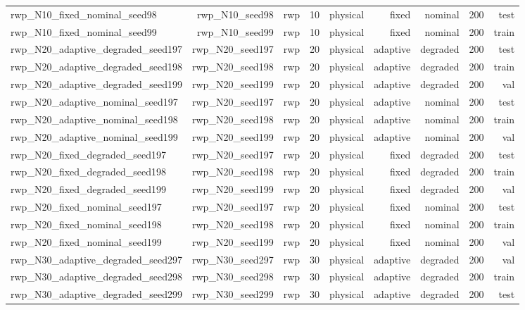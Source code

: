 \begin{tabular}{lrrrrrrrr}
rwp\_N10\_fixed\_nominal\_seed98 & rwp\_N10\_seed98 & rwp & 10 & physical & fixed & nominal & 200 & test \\
rwp\_N10\_fixed\_nominal\_seed99 & rwp\_N10\_seed99 & rwp & 10 & physical & fixed & nominal & 200 & train \\
rwp\_N20\_adaptive\_degraded\_seed197 & rwp\_N20\_seed197 & rwp & 20 & physical & adaptive & degraded & 200 & test \\
rwp\_N20\_adaptive\_degraded\_seed198 & rwp\_N20\_seed198 & rwp & 20 & physical & adaptive & degraded & 200 & train \\
rwp\_N20\_adaptive\_degraded\_seed199 & rwp\_N20\_seed199 & rwp & 20 & physical & adaptive & degraded & 200 & val \\
rwp\_N20\_adaptive\_nominal\_seed197 & rwp\_N20\_seed197 & rwp & 20 & physical & adaptive & nominal & 200 & test \\
rwp\_N20\_adaptive\_nominal\_seed198 & rwp\_N20\_seed198 & rwp & 20 & physical & adaptive & nominal & 200 & train \\
rwp\_N20\_adaptive\_nominal\_seed199 & rwp\_N20\_seed199 & rwp & 20 & physical & adaptive & nominal & 200 & val \\
rwp\_N20\_fixed\_degraded\_seed197 & rwp\_N20\_seed197 & rwp & 20 & physical & fixed & degraded & 200 & test \\
rwp\_N20\_fixed\_degraded\_seed198 & rwp\_N20\_seed198 & rwp & 20 & physical & fixed & degraded & 200 & train \\
rwp\_N20\_fixed\_degraded\_seed199 & rwp\_N20\_seed199 & rwp & 20 & physical & fixed & degraded & 200 & val \\
rwp\_N20\_fixed\_nominal\_seed197 & rwp\_N20\_seed197 & rwp & 20 & physical & fixed & nominal & 200 & test \\
rwp\_N20\_fixed\_nominal\_seed198 & rwp\_N20\_seed198 & rwp & 20 & physical & fixed & nominal & 200 & train \\
rwp\_N20\_fixed\_nominal\_seed199 & rwp\_N20\_seed199 & rwp & 20 & physical & fixed & nominal & 200 & val \\
rwp\_N30\_adaptive\_degraded\_seed297 & rwp\_N30\_seed297 & rwp & 30 & physical & adaptive & degraded & 200 & val \\
rwp\_N30\_adaptive\_degraded\_seed298 & rwp\_N30\_seed298 & rwp & 30 & physical & adaptive & degraded & 200 & train \\
rwp\_N30\_adaptive\_degraded\_seed299 & rwp\_N30\_seed299 & rwp & 30 & physical & adaptive & degraded & 200 & test \\

\end{tabular}
